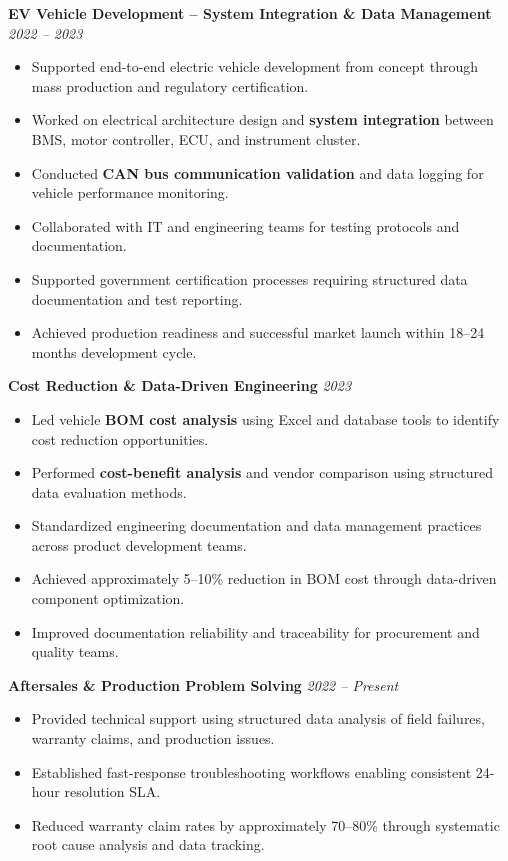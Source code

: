 \documentclass[a4paper,10pt]{article}
\begin{document}
\vspace{6pt}

\textbf{EV Vehicle Development – System Integration \& Data Management} \hfill \textit{2022 – 2023}
\begin{itemize}
    \item Supported end-to-end electric vehicle development from concept through mass production and regulatory certification.
    \item Worked on electrical architecture design and \textbf{system integration} between BMS, motor controller, ECU, and instrument cluster.
    \item Conducted \textbf{CAN bus communication validation} and data logging for vehicle performance monitoring.
    \item Collaborated with IT and engineering teams for testing protocols and documentation.
    \item Supported government certification processes requiring structured data documentation and test reporting.
    \item Achieved production readiness and successful market launch within 18–24 months development cycle.
\end{itemize}

\vspace{6pt}

\textbf{Cost Reduction \& Data-Driven Engineering} \hfill \textit{2023}
\begin{itemize}
    \item Led vehicle \textbf{BOM cost analysis} using Excel and database tools to identify cost reduction opportunities.
    \item Performed \textbf{cost-benefit analysis} and vendor comparison using structured data evaluation methods.
    \item Standardized engineering documentation and data management practices across product development teams.
    \item Achieved approximately 5–10\% reduction in BOM cost through data-driven component optimization.
    \item Improved documentation reliability and traceability for procurement and quality teams.
\end{itemize}

\vspace{6pt}

\textbf{Aftersales \& Production Problem Solving} \hfill \textit{2022 – Present}
\begin{itemize}
    \item Provided technical support using structured data analysis of field failures, warranty claims, and production issues.
    \item Established fast-response troubleshooting workflows enabling consistent 24-hour resolution SLA.
    \item Reduced warranty claim rates by approximately 70–80\% through systematic root cause analysis and data tracking.
\end{itemize}
\end{document}

